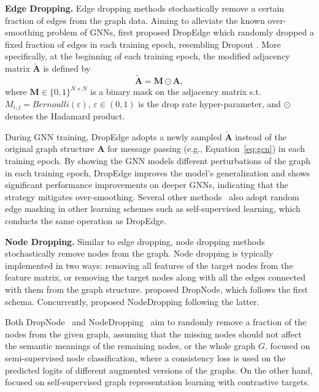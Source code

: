 \documentclass[11pt]{article}
\renewcommand\paragraph[1]{\vspace{0.05in} \noindent \textbf{#1.}}
\begin{document}
\paragraph{Edge Dropping} Edge dropping methods stochastically remove a certain fraction of edges from the graph data. Aiming to alleviate the known over-smoothing problem of GNNs, \citet{rong2019dropedge} first proposed DropEdge which randomly dropped a fixed fraction of edges in each training epoch, resembling Dropout \cite{srivastava2014dropout}. More specifically, at the beginning of each training epoch, the modified adjacency matrix $\tilde{\mathbf{A}}$ is defined by
\begin{equation}
    \tilde{\mathbf{A}} = \mathbf{M} \odot \mathbf{A}, %
\end{equation}
where $\mathbf{M} \in \{0, 1\}^{N \times N}$ is a binary mask on the adjacency matrix s.t. $M_{i,j} = Bernoulli(\varepsilon)$, $\varepsilon \in (0,1)$ is the drop rate hyper-parameter, and $\odot$ denotes the Hadamard product.

During GNN training, DropEdge adopts a newly sampled $\tilde{\mathbf{A}}$ instead of the original graph structure $\mathbf{A}$ for message passing (e.g., Equation~\eqref{eq:gcn}) in each training epoch. By showing the GNN models different perturbations of the graph in each training epoch, DropEdge improves the model's generalization and shows significant performance improvements on deeper GNNs, indicating that the strategy mitigates over-smoothing. Several other methods~\cite{you2020graph,thakoor2022largescale,zhao2022autogda} also adopt random edge masking in other learning schemes such as self-supervised learning, which conducts the same operation as DropEdge.

\paragraph{Node Dropping} Similar to edge dropping, node dropping methods stochastically remove nodes from the graph. Node dropping is typically implemented in two ways: removing all features of the target nodes from the feature matrix, or removing the target nodes along with all the edges connected with them from the graph structure. 
\citet{feng2020graph} proposed DropNode, which follows the first schema. Concurrently, \citet{you2020graph} proposed NodeDropping following the latter.

Both DropNode~\cite{feng2020graph} and NodeDropping~\cite{you2020graph} aim to randomly remove a fraction of the nodes from the given graph, assuming that the missing nodes should not affect the semantic meanings of the remaining nodes, or the whole graph $G$. 
\citet{feng2020graph} focused on semi-supervised node classification, where a consistency loss is used on the predicted logits of different augmented versions of the graphs. On the other hand, \citet{you2020graph} focused on self-supervised graph representation learning with contrastive targets.
\end{document}

